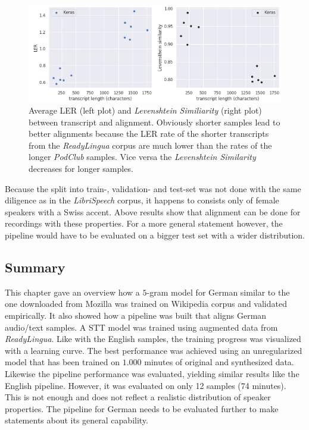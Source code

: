 \begin{figure}[h!]
	\includegraphics[width=\linewidth]{./img/scatterplot_rl.png}
	\caption{Average \ac{LER} (left plot) and \textit{Levenshtein Similiarity} (right plot) between transcript and alignment. Obviously shorter samples lead to better alignments because the \ac{LER} rate of the shorter transcripts from the \textit{ReadyLingua} corpus are much lower than the rates of the longer \textit{PodClub} samples. Vice versa the \textit{Levenshtein Similarity} decreases for longer samples.}
	\label{pipeline_scatterplot_rl_de}
\end{figure}

Because the split into train-, validation- and test-set was not done with the same diligence as in the \textit{LibriSpeech} corpus, it happens to consists only of female speakers with a Swiss accent. Above results show that alignment can be done for recordings with these properties. For a more general statement however, the pipeline would have to be evaluated on a bigger test set with a wider distribution.

\subsection{Summary}

This chapter gave an overview how a $5$-gram model for German similar to the one downloaded from Mozilla was trained on Wikipedia corpus and validated empirically. It also showed how a pipeline was built that aligns German audio/text samples. A \ac{STT} model was trained using augmented data from \textit{ReadyLingua}. Like with the English samples, the training progress was visualized with a learning curve. The best performance was achieved using an unregularized model that has been trained on $1.000$ minutes of original and synthesized data. Likewise the pipeline performance was evaluated, yielding similar results like the English pipeline. However, it was evaluated on only 12 samples (74 minutes). This is not enough and does not reflect a realistic distribution of speaker properties. The pipeline for German needs to be evaluated further to make statements about its general capability.